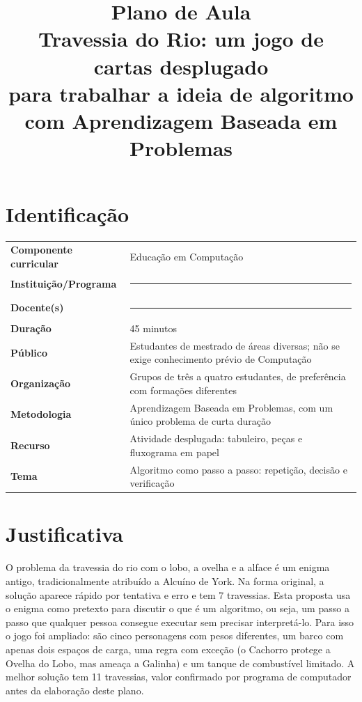 \documentclass[12pt,a4paper]{article}
\title{\textbf{Plano de Aula}\\[4pt]
\large Travessia do Rio: um jogo de cartas desplugado\\
para trabalhar a ideia de algoritmo com Aprendizagem Baseada em Problemas}
\author{}
\date{}
\begin{document}
\maketitle
\vspace{-1.5cm}

\section{Identificação}

\begin{tabular}{@{}>{\bfseries}p{4.9cm}p{9.8cm}@{}}
Componente curricular & Educação em Computação \\
Instituição/Programa  & \rule[-2pt]{7cm}{0.4pt} \\
Docente(s)            & \rule[-2pt]{7cm}{0.4pt} \\
Duração               & 45 minutos \\
Público               & Estudantes de mestrado de áreas diversas; não se exige conhecimento prévio de Computação \\
Organização           & Grupos de três a quatro estudantes, de preferência com formações diferentes \\
Metodologia           & Aprendizagem Baseada em Problemas, com um único problema de curta duração \\
Recurso               & Atividade desplugada: tabuleiro, peças e fluxograma em papel \\
Tema                  & Algoritmo como passo a passo: repetição, decisão e verificação \\
\end{tabular}

\section{Justificativa}

O problema da travessia do rio com o lobo, a ovelha e a alface é um enigma
antigo, tradicionalmente atribuído a Alcuíno de York. Na forma
original, a solução aparece rápido por tentativa e erro e tem 7 travessias.
Esta proposta usa o enigma como pretexto para discutir o que é um algoritmo, ou
seja, um passo a passo que qualquer pessoa consegue executar sem precisar
interpretá-lo. Para isso o jogo foi ampliado: são cinco personagens com pesos
diferentes, um barco com apenas dois espaços de carga, uma regra com exceção (o
Cachorro protege a Ovelha do Lobo, mas ameaça a Galinha) e um tanque de
combustível limitado. A melhor solução tem 11 travessias, valor confirmado por
programa de computador antes da elaboração deste plano.
\end{document}
